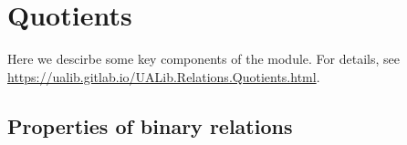 \documentclass[a4paper,UKenglish,cleveref,autoref,thm-restate,11pt]{lipics-v2021}
\begin{document}






\section{Quotients}\label{quotient-types}

Here we descirbe some key components of the \ualibQuotients module. For details, see \url{https://ualib.gitlab.io/UALib.Relations.Quotients.html}.

\subsection{Properties of binary relations}\label{properties-of-binary-relations}
\end{document}
